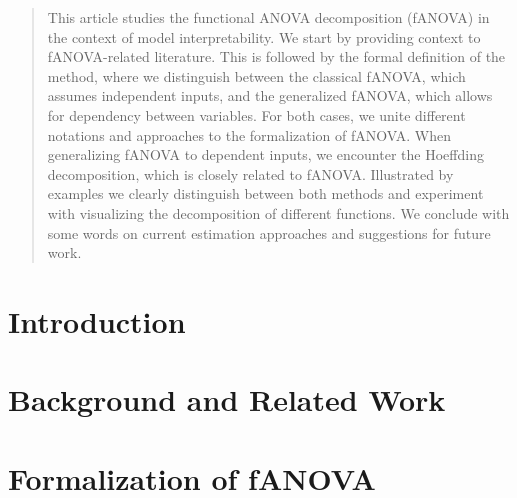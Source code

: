 \documentclass[12pt]{article}
\begin{document}
\begin{abstract}

This article studies the functional ANOVA decomposition (fANOVA) in the context of model interpretability.
We start by providing context to fANOVA-related literature.
This is followed by the formal definition of the method, where we distinguish between the classical fANOVA, which assumes independent inputs, and the generalized fANOVA, which allows for dependency between variables.
For both cases, we unite different notations and approaches to the formalization of fANOVA. When generalizing fANOVA to dependent inputs, we encounter the Hoeffding decomposition, which is closely related to fANOVA. Illustrated by examples we clearly distinguish between both methods and experiment with visualizing the decomposition of different functions. We conclude with some words on current estimation approaches and suggestions for future work.
\end{abstract}

\newpage
\tableofcontents

\newpage



\section{Introduction}\label{sec:intro}

\newpage

% 
\section{Background and Related Work}\label{sec:related_work}


\newpage
\section{Formalization of fANOVA}\label{sec:formalization_fANOVA}

\end{document}
